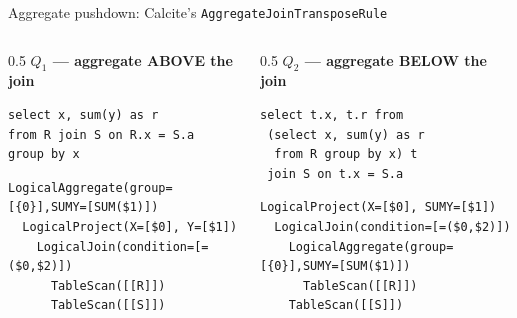 \documentclass[9pt,aspectratio=169]{beamer}
\begin{document}
\begin{frame}[fragile]{Aggregate pushdown: Calcite's \texttt{AggregateJoinTransposeRule}}
\begin{columns}[T]
\begin{column}{0.5\textwidth}
\textbf{$Q_1$ --- aggregate ABOVE the join}
\begin{lstlisting}
select x, sum(y) as r
from R join S on R.x = S.a
group by x
\end{lstlisting}
\begin{lstlisting}[style=plan,basicstyle=\ttfamily\tiny]
LogicalAggregate(group=[{0}],SUMY=[SUM($1)])
  LogicalProject(X=[$0], Y=[$1])
    LogicalJoin(condition=[=($0,$2)])
      TableScan([[R]])
      TableScan([[S]])
\end{lstlisting}
\end{column}
\begin{column}{0.5\textwidth}
\textbf{$Q_2$ --- aggregate BELOW the join}
\begin{lstlisting}
select t.x, t.r from
 (select x, sum(y) as r
  from R group by x) t
 join S on t.x = S.a
\end{lstlisting}
\begin{lstlisting}[style=plan,basicstyle=\ttfamily\tiny]
LogicalProject(X=[$0], SUMY=[$1])
  LogicalJoin(condition=[=($0,$2)])
    LogicalAggregate(group=[{0}],SUMY=[SUM($1)])
      TableScan([[R]])
    TableScan([[S]])
\end{lstlisting}
\end{column}
\end{columns}
\end{frame}
\end{document}
